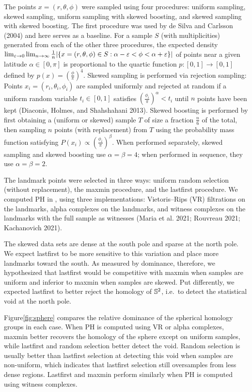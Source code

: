 \documentclass{article}
\begin{document}
The points \(x=(r,\theta,\phi)\) were sampled using four procedures:
uniform sampling, skewed sampling, uniform sampling with skewed
boosting, and skewed sampling with skewed boosting. The first procedure
was used by de Silva and Carlsson (2004) and here serves as a baseline.
For a sample \(S\) (with multiplicities) generated from each of the
other three procedures, the expected density
\(\lim_{\varepsilon\to 0}\lim_{n\to\infty}\frac{1}{n}\lvert \{x=(r,\theta,\phi)\in S : \alpha-\varepsilon<\phi<\alpha+\varepsilon\}\rvert\)
of points near a given latitude \(\alpha\in[0,\pi]\) is proportional to
the quartic function \(p:[0,1]\to[0,1]\) defined by
\(p(x)=(\frac{\phi}{\pi})^4\). Skewed sampling is performed via
rejection sampling: Points \(x_i=(r_i,\theta_i,\phi_i)\) are sampled
uniformly and rejected at random if a uniform random variable
\(t_i\in[0,1]\) satisfies \((\frac{\phi_i}{\pi})^\alpha<t_i\) until
\(n\) points have been kept (Diaconis, Holmes, and Shahshahani 2013).
Skewed boosting is performed by first obtaining a (uniform or skewed)
sample \(T\) of size a fraction \(\frac{n}{6}\) of the total, then
sampling \(n\) points (with replacement) from \(T\) using the
probability mass function satisfying
\(P(x_i)\propto(\frac{\phi_i}{\pi})^\beta\). When performed separately,
skewed sampling and skewed boosting use \(\alpha=\beta=4\); when
performed in sequence, they use \(\alpha=\beta=2\).

The landmark points were selected in three ways: uniform random
selection (without replacement), the maxmin procedure, and the lastfirst
procedure. We computed PH in , using three
implementations: Vietoris--Rips (VR) filtrations on the landmarks, alpha
complexes on the landmarks, and witness complexes on the landmarks with
the full sample as witnesses (Maria et al. 2021; Rouvreau 2021;
Kachanovich 2021).

The skewed data sets are dense at the south pole and sparse at the north
pole. We expect lastfirst to be more sensitive to this variation and
place more landmarks toward the south. As measured by dominance,
therefore, we hypothesized that lastfirst would be competitive with
maxmin when samples are uniform and inferior to maxmin when samples are
skewed. Put differently, we expected lastfirst to better reject the
homology of \(\mathbb{S}^2\), i.e.~to detect the statistical void at the north
pole.

Figure\nbs\ref{fig:sphere} compares the relative dominance of the
spherical homology groups in each case. When PH is computed using VR or
alpha complexes, maxmin better recovers the homology of the sphere
except on uniform samples, while lastfirst and random selection better
detect the void. Random selection is usually better than lastfirst
selection at detecting this void when samples are non-uniform, which
indicates that lastfirst selection still oversamples from less dense
regions. Lastfirst and maxmin perform similarly when PH is computed
using witness complexes.
\end{document}

